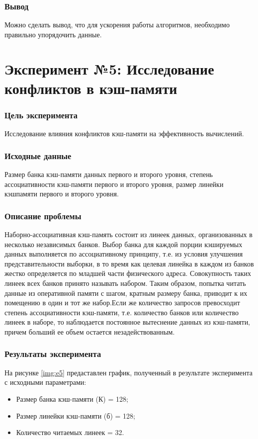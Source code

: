 \subsection*{Вывод}
Можно сделать вывод, что для ускорения работы алгоритмов, необходимо правильно упорядочить данные.


\chapter*{Эксперимент №5: Исследование конфликтов в кэш-памяти}

\subsection*{Цель эксперимента}
Исследование влияния конфликтов кэш-памяти на эффективность вычислений.


\subsection*{Исходные данные}
Размер банка кэш-памяти данных первого и второго уровня, степень ассоциативности кэш-памяти первого и второго уровня, размер линейки кэшпамяти первого и второго уровня.

\subsection*{Описание проблемы}
Наборно-ассоциативная кэш-память состоит из линеек данных, организованных в несколько независимых банков. Выбор банка для каждой порции кэшируемых данных выполняется по ассоциативному принципу, т.е. из условия улучшения представительности выборки, в то время как целевая линейка в каждом из банков жестко определяется по младшей части физического адреса. Совокупность таких линеек всех банков принято называть набором. Таким образом, попытка читать данные из оперативной памяти с шагом, кратным размеру банка, приводит к их помещению в один и тот же набор.Если же количество запросов превосходит степень ассоциативности кэш-памяти, т.е. количество банков или количество линеек в наборе, то наблюдается постоянное вытеснение данных из кэш-памяти, причем больший ее объем остается незадействованным. 

\subsection*{Результаты эксперимента}
На рисунке \ref{img:e5} предаставлен график, полученный в результате эксперимента с исходными параметрами:
\begin{itemize}
	\item Размер банка кэш-памяти (К) = 128;
	\item Размер линейки кэш-памяти (б) = 128;
	\item Количество читаемых линеек = 32.
\end{itemize}

